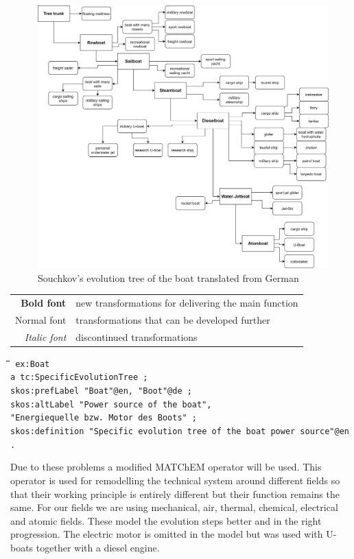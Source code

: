 \documentclass[11pt,a4paper]{article}
\newenvironment{code}{\tt \begin{tabbing}
\hskip12pt\=\hskip12pt\=\hskip12pt\=\hskip12pt\=\hskip5cm\=\hskip5cm\=\kill}
{\end{tabbing}}
\begin{document}
\begin{figure}[htb]
	\centering
	\includegraphics[width=\linewidth]{figures/boat.png}
	\caption{\small Souchkov's evolution tree of the boat translated from German \cite{KS}}
	\label{fig:boat}
\end{figure}
\begin{tabular}{r@{: }l}
\textbf{Bold font} & new transformations for delivering the main function\\
Normal font & transformations that can be developed further\\
\textit{Italic font} & discontinued transformations
\end{tabular}

\begin{code}\tt
ex:Boat \\
\> a tc:SpecificEvolutionTree ; \\
\> skos:prefLabel "Boat"@en, "Boot"@de ; \\
\> skos:altLabel "Power source of the boat", \\
\>\> "Energiequelle bzw. Motor des Boots" ; \\
\> skos:definition "Specific evolution tree of the boat power source"@en . \\
\end{code}

Due to these problems a modified MATChEM operator will be used. This operator is used for remodelling the technical system around different fields so that their working principle is entirely different but their function remains the same. For our fields we are using mechanical, air, thermal, chemical, electrical and atomic fields. These model the evolution steps better and in the right progression. The electric motor is omitted in the model but was used with U-boats together with a diesel engine. 
\end{document}
